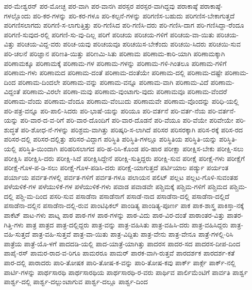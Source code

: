 {ಪರ-ಮೇಶ್ವರನ್
ಪರ-ಮೋಚ್ಛ
ಪರ-ವಾಗಿ
ಪರ-ವಾನಗಿ
ಪರಸ್ಪರ
ಪರಸ್ಪರ-ವಾಗಿದ್ದವು
ಪರಾಕಾಷ್ಠೆ
ಪರಾಕಾಷ್ಠೆ-ಗಳಲ್ಲೊಂದು
ಪರಿ-ಕರ-ಗಳನ್ನು
ಪರಿ-ಕರ-ಗಳೂ
ಪರಿ-ಕಲ್ಪನೆ-ಗಳನ್ನು
ಪರಿಗಣಿಸ-ಬಹುದು
ಪರಿಗಣಿಸ-ಬೇಕಾಗುತ್ತದೆ
ಪರಿಗಣಿಸಲಾಗದು
ಪರಿಗಣಿ-ಸ-ಲಾಗುತ್ತಿತ್ತು
ಪರಿ-ಗಣಿಸಿದ
ಪರಿ-ಗಣಿಸಿ-ದರು
ಪರಿ-ಗಣಿಸಿ-ದಾಗ
ಪರಿ-ಗಣಿಸಿದ್ದಾ-ರೆಂದೂ
ಪರಿಗಣಿ-ಸುವುದ-ರಲ್ಲಿ
ಪರಿಗಣಿ-ಸು-ವು-ದಿಲ್ಲ
ಪರಿಗೆ
ಪರಿಚಯ
ಪರಿಚಯ-ಗಳಿಗೆ
ಪರಿಚಯ-ವಾ-ಯಿತು
ಪರಿಚಯ-ವಿತ್ತು
ಪರಿಚಯ-ವಿದ್ದ-ವರು
ಪರಿಚ-ಯವು
ಪರಿಚಯವೂ
ಪರಿಚಯಿಸ-ಬೇಕೆಂದು
ಪರಿಚಯಿ-ಸಿದರು
ಪರಿಚಯಿ-ಸುವ
ಪರಿ-ಚಲನೆ
ಪರಿಜ್ಞಾನ
ಪರಿಣತಿ-ಯಿತ್ತು
ಪರಿಣಮಿ-ಸಿತು
ಪರಿಣಾಮ
ಪರಿಣಾಮ-ಕಾರಿ-ಯಾಗಿ
ಪರಿಣಾಮಕ್ಕಾಗಿ
ಪರಿಣಾಮಕ್ಕೂ
ಪರಿಣಾಮಕ್ಕೆ
ಪರಿಣಾಮ-ಗಳ
ಪರಿಣಾಮ-ಗಳನ್ನು
ಪರಿಣಾಮ-ಗಳಿ-ಗಿಂತಲೂ
ಪರಿಣಾಮ-ಗಳಿಗೆ
ಪರಿಣಾಮ-ಗಳು
ಪರಿಣಾಮದ
ಪರಿಣಾಮ-ದಂತೆ
ಪರಿಣಾಮ-ದಂತೆಯೇ
ಪರಿಣಾಮ-ದಲ್ಲಿ
ಪರಿಣಾಮ-ದಷ್ಟೇ
ಪರಿಣಾಮ-ದಿಂದ
ಪರಿಣಾಮ-ದಿಂದಲೇ
ಪರಿಣಾಮ-ವನ್ನು
ಪರಿಣಾಮ-ವನ್ನೂ
ಪರಿಣಾಮ-ವಾಗಿ
ಪರಿಣಾಮ-ವಿದೆ
ಪರಿಣಾಮ-ವಿದ್ದಂತೆ
ಪರಿಣಾಮ-ವಿರಲೇ
ಪರಿಣಾ-ಮವು
ಪರಿಣಾಮ-ವುಂಟಾಗು-ವುದು
ಪರಿಣಾಮವೂ
ಪರಿಣಾಮ-ವೆಂದರೆ
ಪರಿಣಾಮ-ವೆಂದು
ಪರಿಣಾಮ-ವೆಂದೂ
ಪರಿಣಾಮ-ವೆಂಬುದು
ಪರಿಣಾಮವೇ
ಪರಿಣಾಮ-ವೊಂದನ್ನು
ಪರಿಧಿ-ಯಲ್ಲಿ
ಪರಿ-ಪತ್ರ-ವನ್ನೂ
ಪರಿ-ಪಾಲಿ-ಸಿದರು
ಪರಿ-ಭಾಷೆ-ಯನ್ನು
ಪರಿಯೂ
ಪರಿ-ವರ್ತನೆ
ಪರಿ-ವರ್ತ-ನೆಯ
ಪರಿ-ವರ್ತನೆ-ಯನ್ನು
ಪರಿ-ವಾರ-ದ-ವ-ರಿಗೆ
ಪರಿ-ವಾರ-ದೊಂದಿಗೆ
ಪರಿ-ವಾರ-ದೊಡನೆ
ಪರಿ-ವೆಯೂ
ಪರಿ-ವೆಯೇ
ಪರಿವೇಯೇ
ಪರಿ-ಶುದ್ಧತೆ
ಪರಿ-ಶೋಧ-ನೆ-ಗಳನ್ನು
ಪರಿಶ್ರಮ-ವಾಗಿತ್ತು
ಪರಿಷ್ಕರಿ-ಸ-ಲಾಗಿದೆ
ಪರಿಸರ
ಪರಿಸರಕ್ಕಾಗಿ
ಪರಿಸ-ರಕ್ಕೆ
ಪರಿಸ-ರದ
ಪರಿಸರ-ದಲ್ಲಿ
ಪರಿಸರ-ದಲ್ಲಿತ್ತು
ಪರಿಸರ-ವಿದ್ದಾಗ
ಪರಿಸ್ಥಿತಿ
ಪರಿಸ್ಥಿತಿ-ಗಳಲ್ಲೂ
ಪರಿಸ್ಥಿತಿಯ
ಪರಿಸ್ಥಿತಿ-ಯನ್ನು
ಪರಿಸ್ಥಿತಿ-ಯಲ್ಲಿ
ಪರಿಸ್ಥಿತಿ-ಯಿಂದಾಗಿ
ಪರಿಹರಿಸಲಾಗದ
ಪರಿ-ಹ-ರಿಸಿ-ಕೊಂಡ
ಪರಿ-ಹಾರ
ಪರೀಕ್ಷಾ
ಪರೀಕ್ಷಿಸ-ಬೇಕು
ಪರೀಕ್ಷಿ-ಸಲು
ಪರೀಕ್ಷಿಸಿ
ಪರೀಕ್ಷಿಸಿ-ದರು
ಪರೀಕ್ಷಿ-ಸಿದೆ
ಪರೀಕ್ಷಿಸಿದ್ದೇನೆ
ಪರೀಕ್ಷಿ-ಸುತ್ತಿದ್ದರು
ಪರೀಕ್ಷಿ-ಸುವ
ಪರೀಕ್ಷೆ
ಪರೀಕ್ಷೆ-ಗಳು
ಪರೀಕ್ಷೆಗೆ
ಪರೀಕ್ಷೆ-ಗೊಳ-ಪ-ಡಿ-ಸಲು
ಪರೀಕ್ಷೆ-ಗೊಳ-ಪಡಿಸಿ-ದರು
ಪರೀಕ್ಷೆ-ಯಾಗುತ್ತದೆ
ಪರ್ಟಿಯಾಲ
ಪರ್ಡ್ಯು
ಪರ್ಯಂತ
ಪರ್ಯಾಯ
ಪರ್ವತ-ಗಳಲ್ಲಿ
ಪರ್ವತ-ಗಳಿಗೆ
ಪರ್ವತ-ಗಳೂ
ಪಲಾಯನ
ಪಲಿಟ್
ಪಲ್ಲಟ
ಪಲ್ಲಟ-ಗೊಳಿ-ಸುವಂತಹ
ಪಳೆಯಳಿಕೆ-ಗಳ
ಪಳೆಯುಳಿಕೆ-ಗಳ
ಪಳೆಯುಳಿಕೆ-ಗಳು
ಪವಾಡ
ಪವಾಡವೇ
ಪಶ್ಚಿಮಕ್ಕೆ
ಪಶ್ಚಿಮ-ಗಳಿಗೆ
ಪಶ್ಚಿಮದ
ಪಶ್ಚಿಮ-ದಲ್ಲಿ
ಪಶ್ಚಿ-ಮ-ದಿಂದ
ಪಸರಿ-ಸುವ
ಪಸಾಡೆನಾ
ಪಸಾಡೆನಾಗೆ
ಪಸಾಡೆ-ನಾದ
ಪಸಾಡೆನಾ-ದಲ್ಲಿ
ಪಸಾಡೆನಾ-ದಲ್ಲಿದೆ
ಪಸಾಡೆನಾ-ದಲ್ಲಿನ
ಪಸಾಡೆನಾ-ದಲ್ಲಿ-ರುವ
ಪಾಂಟಿಫಿಕಲ್
ಪಾಂಡಿತ್ಯ
ಪಾಂಡಿತ್ಯ-ಪೂರ್ಣ
ಪಾಕ
ಪಾಕ-ಶಾಸ್ತ್ರ
ಪಾಕಿಸ್ತಾ-ನಕ್ಕೆ
ಪಾಕೆಟ್
ಪಾಟ-ಗಳು
ಪಾಟ್ನ
ಪಾಠ
ಪಾಠ-ಗಳ
ಪಾಠ-ಗಳನ್ನು
ಪಾಠ-ವಿದು
ಪಾಠ-ವಿರ-ದಂತೆ
ಪಾಠಾಂತರ-ವಿತ್ತು
ಪಾತರ-ಗಿತ್ತಿ-ಗಳು
ಪಾತ್ರ
ಪಾತ್ರದ
ಪಾತ್ರ-ದಲ್ಲಿದ್ದರು
ಪಾತ್ರ-ವನ್ನು
ಪಾತ್ರ-ವಹಿಸಿತು
ಪಾತ್ರ-ವಹಿಸಿ-ದರು
ಪಾತ್ರ-ವಹಿಸಿದ್ದರು
ಪಾತ್ರ-ವಹಿ-ಸುತ್ತದೆ
ಪಾತ್ರ-ವಹಿ-ಸುತ್ತವೆ
ಪಾತ್ರ-ವಾ-ಯಿತು
ಪಾತ್ರ-ವಿದ್ದಿತು
ಪಾತ್ರ-ವೇನು
ಪಾತ್ರ-ವೇನೂ
ಪಾತ್ರೆ-ಗಳಲ್ಲಿ-ರಿಸಿ
ಪಾತ್ರೆಯ
ಪಾತ್ರೆ-ಯೊ-ಳಗೆ
ಪಾದದಡಿ-ಯಲ್ಲಿ
ಪಾದ-ಯಾತ್ರೆ-ಯಾಗಿತ್ತು
ಪಾದರಸ
ಪಾದರ-ಸದ
ಪಾದರಸ-ದೀಪ-ದಿಂದ
ಪಾಪೈ-ರಸ್
ಪಾಮರ-ರಾದ-ವ-ರಿಗೂ
ಪಾಮರರೂ
ಪಾಮರ್
ಪಾರಕ-ವಾಗಿ-ರುತ್ತವೆ
ಪಾರದರ್ಶಕ
ಪಾರದರ್ಶ-ಕತೆ
ಪಾರ-ದಲ್ಲಿ
ಪಾರಾದರು
ಪಾರಿ-ತೋಷಕ
ಪಾರಿ-ತೋಷ-ಕ-ವನ್ನು
ಪಾರಿ-ತೋಷ-ಕವು
ಪಾರ್ಕ್
ಪಾರ್ಕ್ಗೆ
ಪಾರ್ಕ್-ನಲ್ಲಿ
ಪಾರ್ಟಿ-ಗಳನ್ನು
ಪಾರ್ಥಸಾರಥಿ
ಪಾರ್ಥಸಾರಥಿಯ
ಪಾರ್ಥಸಾರಥಿ-ರ-ವರು
ಪಾರ್ಥಿವ
ಪಾರ್ಲಿಮೆಂಟಿಗೆ
ಪಾರ್ವತಿ
ಪಾರ್ಶ್ವ
ಪಾರ್ಶ್ವ-ದಲ್ಲಿ
ಪಾರ್ಶ್ವ-ದಲ್ಲುಂಟಾಗುವ
ಪಾರ್ಶ್ವ-ದಲ್ಲೂ
ಪಾರ್ಶ್ವ-ದಿಂದ
}
